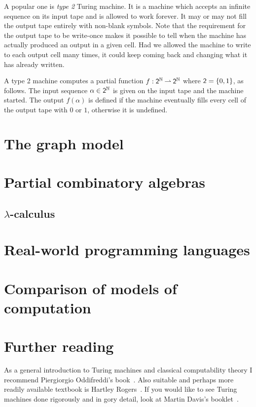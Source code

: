 A popular one is \emph{type 2} Turing machine. It is a machine which
accepts an infinite sequence on its input tape and is allowed to work
forever. It may or may not fill the output tape entirely with
non-blank symbols. Note that the requirement for the output tape to be
write-once makes it possible to tell when the machine has actually
produced an output in a given cell. Had we allowed the machine to
write to each output cell many times, it could keep coming back and
changing what it has already written.

A type 2 machine computes a partial function $f : \mathsf{2}^{\mathbb{N}} \mathbin{\rightharpoonup}
\mathsf{2}^{\mathbb{N}}$ where $\mathsf{2} = \{0,1\}$, as follows. The input sequence
$\alpha \in \mathsf{2}^{\mathbb{N}}$ is given on the input tape and the machine
started. The output $f(\alpha)$ is defined if the machine eventually
fills every cell of the output tape with $0$ or $1$, otherwise it is
undefined.


\section{The graph model}
\label{sec:graph-model}


\section{Partial combinatory algebras}
\label{sec:pcas}

\subsection{$\lambda$-calculus}
\label{sec:lambda-calculus}




\section{Real-world programming languages}
\label{sec:programming-languages}


\section{Comparison of models of computation}
\label{sec:models-comparison}



\section{Further reading}
\label{sec:models-further-reading}

As a general introduction to Turing machines and classical
computability theory I recommend Piergiorgio Oddifreddi's
book~\cite{Oddifreddi}. Also suitable and perhaps more readily
available textbook is Hartley Rogers~\cite{Rogers}. If you would like
to see Turing machines done rigorously and in gory detail, look at
Martin Davis's booklet~\cite{Davis}.



